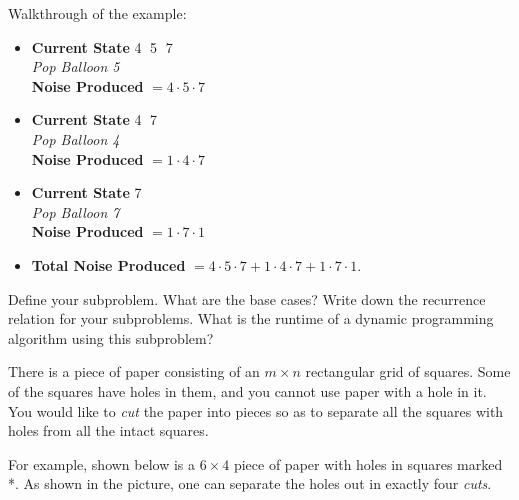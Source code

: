 \documentclass{article}
\begin{document}
 Walkthrough of the example:
 \begin{itemize}
	 \item \textbf{Current State}  \textcircled{4} \textcircled{5}  \textcircled{7} \\
		 \textit{Pop Balloon \textcircled{5} }\\
		\textbf{Noise Produced  } $ = 4 \cdot 5 \cdot 7$\\

	\item \textbf{Current State}  \textcircled{4}  \textcircled{7} \\
		\textit{Pop Balloon \textcircled{4} }\\
		\textbf{Noise Produced  } $= 1 \cdot 4 \cdot 7$\\


	\item \textbf{Current State}  \textcircled{7}\\
		\textit{Pop Balloon \textcircled{7}}\\
		\textbf{Noise Produced  } $=1 \cdot  7 \cdot 1$\\
	
	\item \textbf{Total Noise Produced}  $= 4\cdot 5\cdot 7 + 1\cdot 4\cdot 7 + 1\cdot 7 \cdot 1.$

 \end{itemize}
 
\begin{subparts}
   \subpart Define your subproblem.
   \subpart What are the base cases?
   \subpart Write down the recurrence relation for your subproblems. What is the runtime of a dynamic programming algorithm using this subproblem?
   \end{subparts}

 There is a piece of paper consisting of an $m \times n$ rectangular grid
of squares.  Some of the squares have holes in them, and you cannot use paper with a hole in it.
You would like to {\it cut} the paper into pieces so as to
separate all the squares with holes from all the intact squares.

For example, shown below is a $6 \times 4$ piece of paper with holes in
squares marked *.  As shown in the picture, one can separate the holes out in
exactly four {\it cuts}.
\end{document}
